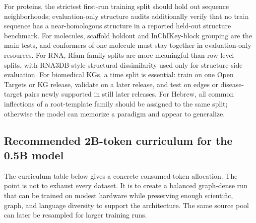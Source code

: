 \documentclass[11pt]{article}
\newcommand{\1}{\mathbf{1}}
\begin{document}
For proteins, the strictest first-run training split should hold out sequence neighborhoods; evaluation-only structure audits additionally verify that no train sequence has a near-homologous structure in a reported held-out structure benchmark. For molecules, scaffold holdout and InChIKey-block grouping are the main tests, and conformers of one molecule must stay together in evaluation-only resources. For RNA, Rfam-family splits are more meaningful than row-level splits, with RNA3DB-style structural dissimilarity used only for structure-side evaluation. For biomedical KGs, a time split is essential: train on one Open Targets or KG release, validate on a later release, and test on edges or disease-target pairs newly supported in still later releases. For Hebrew, all common inflections of a root-template family should be assigned to the same split; otherwise the model can memorize a paradigm and appear to generalize.

\subsection{Recommended 2B-token curriculum for the 0.5B model}
\label{sec:two-billion-curriculum}

The curriculum table below gives a concrete consumed-token allocation. The point is not to exhaust every dataset. It is to create a balanced graph-dense run that can be trained on modest hardware while preserving enough scientific, graph, and language diversity to support the architecture. The same source pool can later be resampled for larger training runs.
\end{document}

